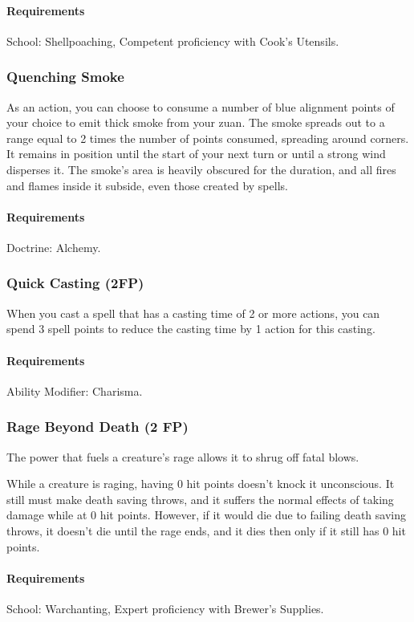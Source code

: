     \paragraph{Requirements} School: Shellpoaching, Competent proficiency with Cook's Utensils.
\subsubsection{Quenching Smoke} \label{feat::quenchingsmoke}
    As an action, you can choose to consume a number of blue alignment points of your choice to emit thick smoke from your zuan.
    The smoke spreads out to a range equal to 2 times the number of points consumed, spreading around corners.
    It remains in position until the start of your next turn or until a strong wind disperses it.
    The smoke's area is heavily obscured for the duration, and all fires and flames inside it subside, even those created by spells.
    \paragraph{Requirements} Doctrine: Alchemy.
\subsubsection{Quick Casting (2FP)} \label{feat::quickcasting}
    When you cast a spell that has a casting time of 2 or more actions, you can spend 3 spell points to reduce the casting time by 1 action for this casting.
    \paragraph{Requirements} Ability Modifier: Charisma.
\subsubsection{Rage Beyond Death (2 FP)} \label{feat::ragebeyonddeath}
    The power that fuels a creature's rage allows it to shrug off fatal blows.

    While a creature is raging, having 0 hit points doesn't knock it unconscious.
    It still must make death saving throws, and it suffers the normal effects of taking damage while at 0 hit points.
    However, if it would die due to failing death saving throws, it doesn't die until the rage ends, and it dies then only if it still has 0 hit points.
    \paragraph{Requirements} School: Warchanting, Expert proficiency with Brewer's Supplies.
